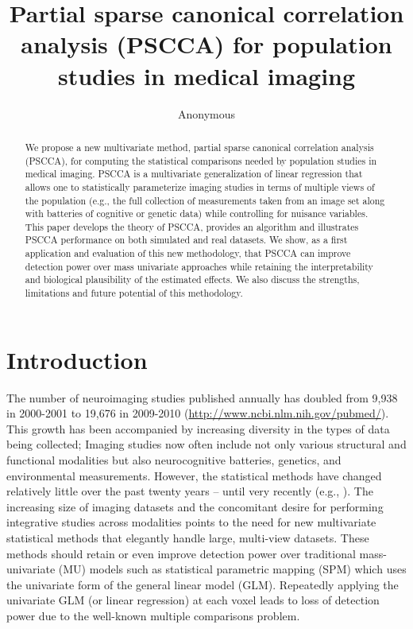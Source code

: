 \documentclass{llncs}
\begin{document}
\vspace{-0.1in}
\title{Partial sparse canonical correlation analysis (PSCCA) for population
  studies in medical imaging}
\author{Anonymous}
\maketitle              
\begin{abstract}
We propose a new multivariate method, partial sparse canonical
correlation analysis (PSCCA), for computing the statistical
comparisons needed by population studies in medical imaging.  PSCCA is a
multivariate generalization of linear regression that allows one to statistically parameterize imaging studies in terms of
multiple views of the population (e.g., the full collection of
measurements taken from an image set along with batteries of cognitive
or genetic data) while controlling for nuisance variables.  This paper
develops the theory of PSCCA, provides an algorithm and illustrates
PSCCA performance on both simulated and real datasets.  We show, as a
first application and evaluation of this new methodology, that
PSCCA can improve detection power over mass univariate approaches
while retaining the interpretability and biological plausibility of
the estimated effects.  We also discuss the strengths, limitations and
future potential of this methodology.
\end{abstract}
\section{Introduction}
The number of neuroimaging studies published annually has doubled from
9,938 in 2000-2001 to 19,676 in 2009-2010
(\url{http://www.ncbi.nlm.nih.gov/pubmed/}).  This growth has been
accompanied by increasing diversity in the types of data being
collected; Imaging studies now often include not only various
structural and functional modalities but also neurocognitive
batteries, genetics, and environmental measurements.  However, the
statistical methods have changed relatively little over the past
twenty years -- until very recently (e.g., \cite{Tosun2010a}).  The
increasing size of imaging datasets and the concomitant desire for
performing integrative studies across modalities points to the need
for new multivariate statistical methods that elegantly handle large,
multi-view datasets.  These methods should retain or even improve
detection power over traditional mass-univariate (MU) models such as
statistical parametric mapping (SPM) which uses the univariate form of
the general linear model (GLM).  Repeatedly applying the univariate GLM (or
linear regression) at each voxel leads to loss of detection power due
to the well-known multiple comparisons problem.
\end{document}
